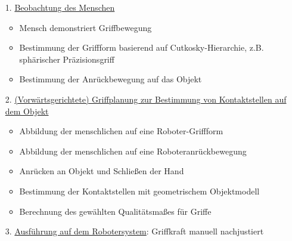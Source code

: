 \begin{itemize}
\item[1.] \underline{Beobachtung des Menschen}
\begin{itemize}
\item Mensch demonstriert Griffbewegung
\item Bestimmung der Griffform basierend auf Cutkosky-Hierarchie, z.B. sphärischer Präzisionsgriff
\item Bestimmung der Anrückbewegung auf das Objekt
\end{itemize} 
\item[2.] \underline{(Vorwärtsgerichtete) Griffplanung zur Bestimmung von Kontaktstellen auf dem Objekt}
\begin{itemize}
\item Abbildung der menschlichen auf eine Roboter-Griffform
\item Abbildung der menschlichen auf eine Roboteranrückbewegung
\item Anrücken an Objekt und Schließen der Hand
\item Bestimmung der Kontaktstellen mit geometrischem Objektmodell
\item Berechnung des gewählten Qualitätsmaßes für Griffe
\end{itemize}
\item[3.] \underline{Ausführung auf dem Robotersystem}: Griffkraft manuell nachjustiert
\end{itemize}